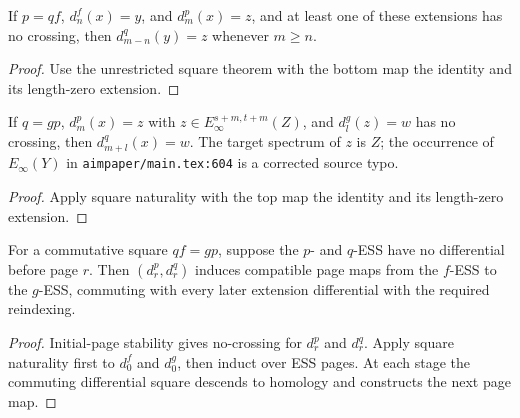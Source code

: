 \begin{corollary}
  \label{cor:fess-triangle-shift}
  \notready
  If $p=qf$, $d_n^f(x)=y$, and $d_m^p(x)=z$, and at least one of these
  extensions has no crossing, then $d_{m-n}^q(y)=z$ whenever $m\ge n$.
\end{corollary}

\begin{proof}
  Use the unrestricted square theorem with the bottom map the identity and
  its length-zero extension.
\end{proof}

\begin{corollary}
  \label{cor:fess-composition}
  \notready
  If $q=gp$, $d_m^p(x)=z$ with
  $z\in E_\infty^{s+m,t+m}(Z)$, and $d_l^g(z)=w$ has no crossing, then
  $d_{m+l}^q(x)=w$.  The target spectrum of $z$ is $Z$; the occurrence of
  $E_\infty(Y)$ in \texttt{aimpaper/main.tex:604} is a corrected source typo.
\end{corollary}

\begin{proof}
  Apply square naturality with the top map the identity and its length-zero
  extension.
\end{proof}

\begin{corollary}
  \label{cor:fess-map-of-stable-pages}
  \notready
  For a commutative square $qf=gp$, suppose the $p$- and $q$-ESS have no
  differential before page $r$.  Then $(d_r^p,d_r^q)$ induces compatible page
  maps from the $f$-ESS to the $g$-ESS, commuting with every later extension
  differential with the required reindexing.
\end{corollary}

\begin{proof}
  Initial-page stability gives no-crossing for $d_r^p$ and $d_r^q$.  Apply
  square naturality first to $d_0^f$ and $d_0^g$, then induct over ESS pages.
  At each stage the commuting differential square descends to homology and
  constructs the next page map.
\end{proof}

